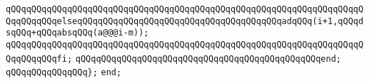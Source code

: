 \verb|qQQqqQQqqQQqqQQqqQQqqQQqqQQqqQQqqQQqqQQqqQQqqQQqqQQqqQQqqQQqqQQqqQQqqQQqqQQqqQQqelseqQQqqQQqqQQqqQQqqQQqqQQqqQQqqQQqqQQqqQQqadqQQq(i+1,qQQqdsqQQq+qQQqabsqQQq(a@@@i-m));|\newline
\verb|qQQqqQQqqQQqqQQqqQQqqQQqqQQqqQQqqQQqqQQqqQQqqQQqqQQqqQQqqQQqqQQqqQQqqQQqqQQqqQQqfi;|\newline
\newline
\verb|qQQqqQQqqQQqqQQqqQQqqQQqqQQqqQQqqQQqqQQqqQQqqQQqend;|\newline
\verb|qQQqqQQqqQQqqQQq};|\newline
\verb|end;|\newline
\newline

